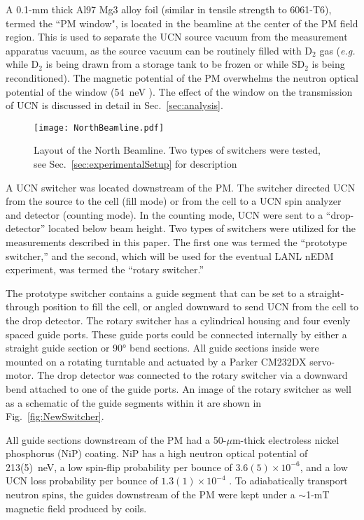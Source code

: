 A 0.1-mm thick Al97 Mg3 alloy foil (similar in tensile strength to 6061-T6), termed the ``PM window", is located in the beamline at the center of the PM field region. This is used to separate the UCN source vacuum from the measurement apparatus vacuum, as the source vacuum can be routinely filled with D$_2$ gas ({\it e.g.} while D$_2$ is being drawn from a storage tank to be frozen or while SD$_2$ is being reconditioned). The magnetic potential of the PM overwhelms the neutron optical potential of the window (\qty{54}{\nano\eV} \cite{golubUCN}). The effect of the window on the transmission of UCN is discussed in detail in Sec.~\ref{sec:analysis}.

\begin{figure}[htp]
    \centering
    \texttt{[image: NorthBeamline.pdf]}
    \caption[Layout of the North Beamline.]{Layout of the North Beamline. Two types of switchers were tested, see Sec.~\ref{sec:experimentalSetup} for description}
    \label{fig:NorthBeamlineLayout}
\end{figure}

A UCN switcher was located downstream of the PM. The switcher directed UCN from the source to the cell (fill mode) or from the cell to a UCN spin analyzer and detector (counting mode). In the counting mode, UCN were sent to a ``drop-detector'' located below beam height. Two types of switchers were utilized for the measurements described in this paper. The first one was termed the ``prototype switcher,'' and the second, which will be used for the eventual LANL nEDM experiment, was termed the ``rotary switcher.'' 

The prototype switcher contains a guide segment that can be set to a straight-through position to fill the cell, or angled downward to send UCN from the cell to the drop detector. The rotary switcher has a cylindrical housing and four evenly spaced guide ports. These guide ports could be connected internally by either a straight guide section or \ang{90} bend sections. All guide sections inside were mounted on a rotating turntable and actuated by a Parker CM232DX servo-motor. The drop detector was connected to the rotary switcher via a downward bend attached to one of the guide ports. An image of the rotary switcher as well as a schematic of the guide segments within it are shown in Fig.~\ref{fig:NewSwitcher}.

All guide sections downstream of the PM had a 50-${\mu}$m-thick electroless nickel phosphorus (NiP) coating. NiP has a high neutron optical potential of 213(5)~\unit{\nano\eV}, a low spin-flip probability per bounce of $3.6(5) \times 10^{-6}$, and a low UCN loss probability per bounce of $1.3(1) \times 10^{-4}$ \cite{tang_measurement_2016, pattie_jr_evaluation_2017}. To adiabatically transport neutron spins, the guides downstream of the PM were kept under a $\sim$1-mT magnetic field produced by coils.

